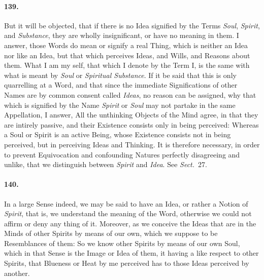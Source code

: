 \documentclass[]{article}
\newenvironment{sectionbody}{\begin{multicols}{2}}{\end{multicols}}
\begin{document}
\begin{sectionbody}
\paragraph{139.}  But it will be objected, that if there is no Idea
signified by the Terms \emph{Soul}, \emph{Spirit}, and
\emph{Substance}, they are wholly insignificant, or have no
meaning in them.  I answer, those Words do mean or signify a real
Thing, which is neither an Idea nor like an Idea, but that which
perceives Ideas, and Wills, and Reasons about them.  What I am my
self, that which I denote by the Term I, is the same with what is
meant by \emph{Soul} or \emph{Spiritual Substance}.  If it be
said that this is only quarrelling at a Word, and that since the
immediate Significations of other Names are by common consent
called \emph{Ideas}, no reason can be assigned, why that which is
signified by the Name \emph{Spirit} or \emph{Soul} may not
partake in the same Appellation, I answer, All the unthinking
Objects of the Mind agree, in that they are intirely passive, and
their Existence consists only in being perceived: Whereas a Soul
or Spirit is an active Being, whose Existence consists not in
being perceived, but in perceiving Ideas and Thinking.  It is
therefore necessary, in order to prevent Equivocation and
confounding Natures perfectly disagreeing and unlike, that we
distinguish between \emph{Spirit} and \emph{Idea}.  See
\emph{Sect.}~27.



\paragraph{140.} In a large Sense indeed, we may be said to have an Idea, or
rather a Notion of \emph{Spirit}, that is, we understand the
meaning of the Word, otherwise we could not affirm or deny any
thing of it.  Moreover, as we conceive the Ideas that are in the
Minds of other Spirits by means of our own, which we suppose to
be Resemblances of them: So we know other Spirits by means of our
own Soul, which in that Sense is the Image or Idea of them, it
having a like respect to other Spirits, that Blueness or Heat by
me perceived has to those Ideas perceived by another.




\end{sectionbody}
\end{document}
